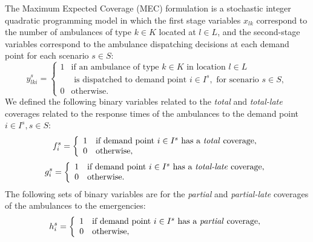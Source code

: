 The Maximum Expected Coverage (MEC) formulation is a stochastic integer qua\-dra\-tic programming model in which the first stage variables $x_{lk}$ correspond to the number of ambulances of type $k\in K$ located at $l\in L$,
and the second-stage variables correspond
to the ambulance dispatching decisions at each demand point for each scenario $s \in S$: %
 \begin{equation*}
       y^s_{lki} = \left\{
       \begin{array}{ll} 
        1 & \text{if an ambulance of type } k\in K \text{ in location } l\in L \\
        & \text{ is dispatched to demand point }i\in I^s, \text{ for scenario }  s\in S, \\
        0 & \text{otherwise}.
       \end{array} \right.
\end{equation*}
We defined the following binary variables related to the \textit{total} and \textit{total-late} coverages related to the response times of the ambulances to the demand point $i\in I^s, s\in S$:
\begin{equation*}
       f^s_{i} = \left\{
       \begin{array}{ll} 
        1 & \text{if demand point  } i\in I^s \text{ has a \textit{total} coverage}, \\
         0 & \text{otherwise},
       \end{array} \right.
\end{equation*}
\begin{equation*}
       g^s_{i} = \left\{
       \begin{array}{ll} 
        1 & \text{if demand point  } i\in I^s \text{ has a \textit{total-late} coverage}, \\
         0 & \text{otherwise}.
       \end{array} \right.
\end{equation*}
The following sets of binary variables are for the \textit{partial} and \textit{partial-late} coverages of the ambulances to the emergencies:
\begin{equation*}
       h^s_{i} = \left\{
       \begin{array}{ll} 
        1 & \text{if demand point  } i\in I^s \text{ has a \textit{partial} coverage}, \\
         0 & \text{otherwise},
       \end{array} \right.
\end{equation*}
